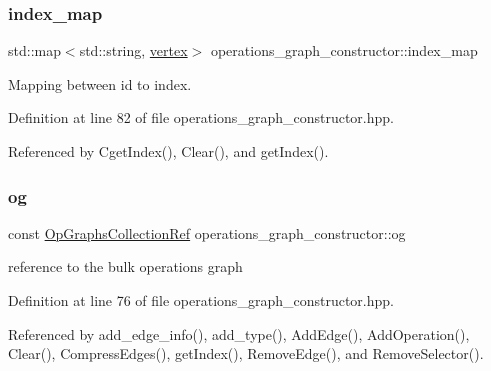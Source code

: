\subsubsection{\texorpdfstring{index\+\_\+map}{index\_map}}
{\footnotesize\ttfamily std\+::map$<$std\+::string, \hyperlink{graph_8hpp_abefdcf0544e601805af44eca032cca14}{vertex}$>$ operations\+\_\+graph\+\_\+constructor\+::index\+\_\+map\hspace{0.3cm}{\ttfamily [private]}}



Mapping between id to index. 



Definition at line 82 of file operations\+\_\+graph\+\_\+constructor.\+hpp.



Referenced by Cget\+Index(), Clear(), and get\+Index().

\mbox{\label{classoperations__graph__constructor_a2284a108ba3d16eac3a2457b5a0cbb94}} 
\subsubsection{\texorpdfstring{og}{og}}
{\footnotesize\ttfamily const \hyperlink{op__graph_8hpp_a6a9918dc96f448814ad35759f9460ed7}{Op\+Graphs\+Collection\+Ref} operations\+\_\+graph\+\_\+constructor\+::og\hspace{0.3cm}{\ttfamily [private]}}



reference to the bulk operations graph 



Definition at line 76 of file operations\+\_\+graph\+\_\+constructor.\+hpp.



Referenced by add\+\_\+edge\+\_\+info(), add\+\_\+type(), Add\+Edge(), Add\+Operation(), Clear(), Compress\+Edges(), get\+Index(), Remove\+Edge(), and Remove\+Selector().

\mbox{\label{classoperations__graph__constructor_ac551692bc712bd66469a7e594c80344f}} 
